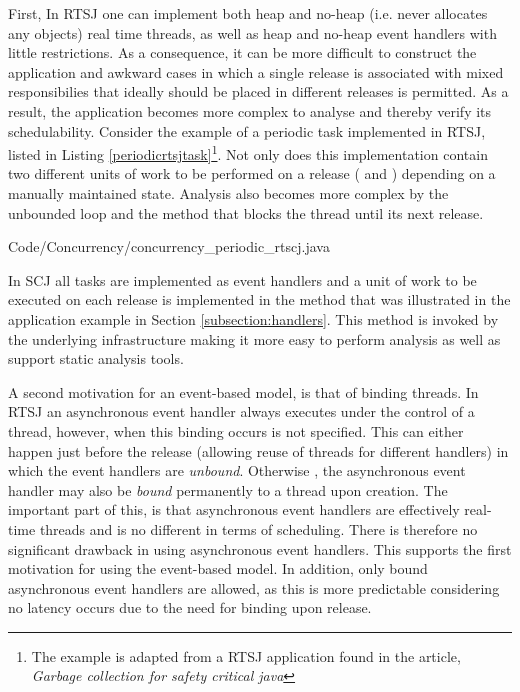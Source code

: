 First, In RTSJ one can implement both heap and no-heap (i.e. never allocates any objects) real time threads, as well as heap and no-heap event handlers with little restrictions. As a consequence, it can be more difficult to construct the application and awkward cases in which a single release is associated with mixed responsibilies that ideally should be placed in different releases is permitted. As a result, the application becomes more complex to analyse and thereby verify its schedulability. Consider the example of a periodic task implemented in RTSJ, listed in Listing \ref{periodicrtsjtask}\footnote{The example is adapted from a RTSJ application found in the article, \textit{Garbage collection for safety critical java}\cite{Schoeberl:2007:GCS:1288940.1288953}}. Not only does this implementation contain two different units of work to be performed on a release ( and ) depending on a manually maintained state. Analysis also becomes more complex by the unbounded loop and the  method that blocks the thread until its next release.


{Code/Concurrency/concurrency_periodic_rtscj.java}

In SCJ all tasks are implemented as event handlers and a unit of work to be executed on each release is implemented in the  method that was illustrated in the application example in Section \ref{subsection:handlers}. This method is invoked by the underlying infrastructure making it more easy to perform analysis as well as support static analysis tools.

A second motivation for an event-based model, is that of binding threads. In RTSJ an asynchronous event handler always executes under the control of a thread, however, when this binding occurs is not specified. This can either happen just before the release (allowing reuse of threads for different handlers) in which the event handlers are \textit{unbound}. Otherwise , the asynchronous event handler may also be \textit{bound} permanently to a thread upon creation. The important part of this, is that asynchronous event handlers are effectively real-time threads and is no different in terms of scheduling. There is therefore no significant drawback in using asynchronous event handlers. This supports the first motivation for using the event-based model. In addition, only bound asynchronous event handlers are allowed, as this is more predictable considering no latency occurs due to the need for binding upon release.

